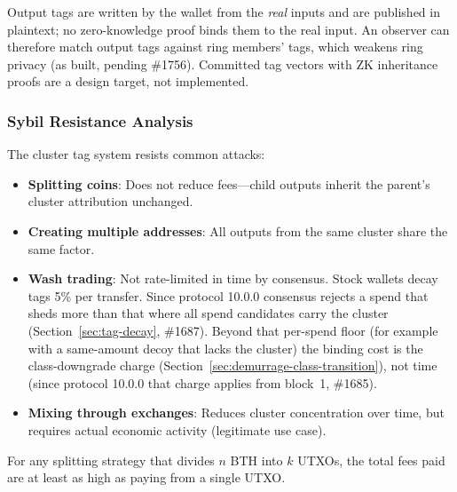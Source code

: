 Output tags are written by the wallet from the \emph{real} inputs and are
published in plaintext; no zero-knowledge proof binds them to the real input.
An observer can therefore match output tags against ring members' tags,
which weakens ring privacy (as built, pending \#1756). Committed tag vectors
with ZK inheritance proofs are a design target, not implemented.

\subsubsection{Sybil Resistance Analysis}

The cluster tag system resists common attacks:

\begin{itemize}
  \item \textbf{Splitting coins}: Does not reduce fees---child outputs
    inherit the parent's cluster attribution unchanged.
  \item \textbf{Creating multiple addresses}: All outputs from the same
    cluster share the same factor.
  \item \textbf{Wash trading}: Not rate-limited in time by consensus. Stock
    wallets decay tags 5\% per transfer. Since protocol 10.0.0 consensus
    rejects a spend that sheds more than that where all spend candidates
    carry the cluster (Section~\ref{sec:tag-decay}, \#1687). Beyond that per-spend floor (for
    example with a same-amount decoy that lacks the cluster) the binding cost
    is the class-downgrade charge
    (Section~\ref{sec:demurrage-class-transition}), not time (since protocol
    10.0.0 that charge applies from block~1,
    \#1685).
  \item \textbf{Mixing through exchanges}: Reduces cluster concentration
    over time, but requires actual economic activity (legitimate use case).
\end{itemize}

\begin{theorem}
\label{thm:sybil-resistance}
For any splitting strategy that divides $n$ BTH into $k$ UTXOs, the total
fees paid are at least as high as paying from a single UTXO.
\end{theorem}

